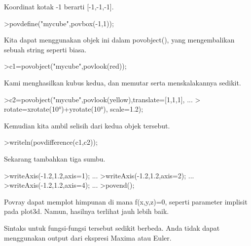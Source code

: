 \documentclass[a4paper,10pt]{article}
\begin{document}
\begin{eulernotebook}
\begin{eulercomment}
\begin{eulercomment}
\begin{eulercomment}
\begin{eulercomment}
\begin{eulercomment}
\begin{eulercomment}
\begin{eulercomment}
\begin{eulercomment}
\begin{eulercomment}
\begin{eulercomment}
\begin{eulercomment}
Koordinat kotak -1 berarti [-1,-1,-1].
\end{eulercomment}
\begin{eulerprompt}
>povdefine("mycube",povbox(-1,1));
\end{eulerprompt}
\begin{eulercomment}
Kita dapat menggunakan objek ini dalam povobject(), yang mengembalikan
sebuah string seperti biasa.
\end{eulercomment}
\begin{eulerprompt}
>c1=povobject("mycube",povlook(red));
\end{eulerprompt}
\begin{eulercomment}
Kami menghasilkan kubus kedua, dan memutar serta menskalakannya
sedikit.
\end{eulercomment}
\begin{eulerprompt}
>c2=povobject("mycube",povlook(yellow),translate=[1,1,1], ...
>  rotate=xrotate(10°)+yrotate(10°), scale=1.2);
\end{eulerprompt}
\begin{eulercomment}
Kemudian kita ambil selisih dari kedua objek tersebut.
\end{eulercomment}
\begin{eulerprompt}
>writeln(povdifference(c1,c2));
\end{eulerprompt}
\begin{eulercomment}
Sekarang tambahkan tiga sumbu.
\end{eulercomment}
\begin{eulerprompt}
>writeAxis(-1.2,1.2,axis=1); ...
>writeAxis(-1.2,1.2,axis=2); ...
>writeAxis(-1.2,1.2,axis=4); ...
>povend();
\end{eulerprompt}
\begin{eulercomment}
Povray dapat memplot himpunan di mana f(x,y,z)=0, seperti parameter
implisit pada plot3d. Namun, hasilnya terlihat jauh lebih baik.

Sintaks untuk fungsi-fungsi tersebut sedikit berbeda. Anda tidak dapat
menggunakan output dari ekspresi Maxima atau Euler.


\end{eulercomment}
\end{eulercomment}
\end{eulercomment}
\end{eulercomment}
\end{eulercomment}
\end{eulercomment}
\end{eulercomment}
\end{eulercomment}
\end{eulercomment}
\end{eulercomment}
\end{eulercomment}
\end{eulernotebook}
\end{document}
